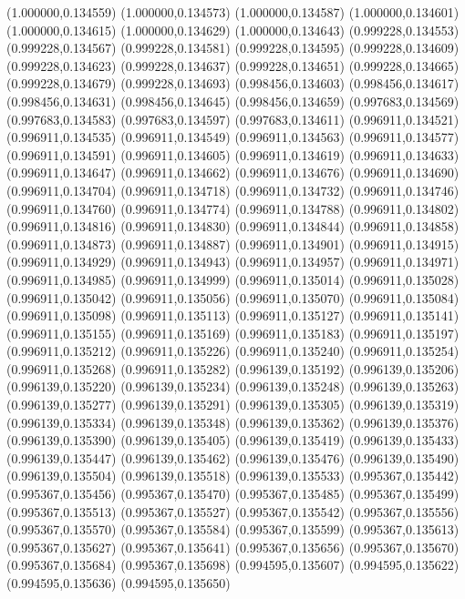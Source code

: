 (1.000000,0.134559)
(1.000000,0.134573)
(1.000000,0.134587)
(1.000000,0.134601)
(1.000000,0.134615)
(1.000000,0.134629)
(1.000000,0.134643)
(0.999228,0.134553)
(0.999228,0.134567)
(0.999228,0.134581)
(0.999228,0.134595)
(0.999228,0.134609)
(0.999228,0.134623)
(0.999228,0.134637)
(0.999228,0.134651)
(0.999228,0.134665)
(0.999228,0.134679)
(0.999228,0.134693)
(0.998456,0.134603)
(0.998456,0.134617)
(0.998456,0.134631)
(0.998456,0.134645)
(0.998456,0.134659)
(0.997683,0.134569)
(0.997683,0.134583)
(0.997683,0.134597)
(0.997683,0.134611)
(0.996911,0.134521)
(0.996911,0.134535)
(0.996911,0.134549)
(0.996911,0.134563)
(0.996911,0.134577)
(0.996911,0.134591)
(0.996911,0.134605)
(0.996911,0.134619)
(0.996911,0.134633)
(0.996911,0.134647)
(0.996911,0.134662)
(0.996911,0.134676)
(0.996911,0.134690)
(0.996911,0.134704)
(0.996911,0.134718)
(0.996911,0.134732)
(0.996911,0.134746)
(0.996911,0.134760)
(0.996911,0.134774)
(0.996911,0.134788)
(0.996911,0.134802)
(0.996911,0.134816)
(0.996911,0.134830)
(0.996911,0.134844)
(0.996911,0.134858)
(0.996911,0.134873)
(0.996911,0.134887)
(0.996911,0.134901)
(0.996911,0.134915)
(0.996911,0.134929)
(0.996911,0.134943)
(0.996911,0.134957)
(0.996911,0.134971)
(0.996911,0.134985)
(0.996911,0.134999)
(0.996911,0.135014)
(0.996911,0.135028)
(0.996911,0.135042)
(0.996911,0.135056)
(0.996911,0.135070)
(0.996911,0.135084)
(0.996911,0.135098)
(0.996911,0.135113)
(0.996911,0.135127)
(0.996911,0.135141)
(0.996911,0.135155)
(0.996911,0.135169)
(0.996911,0.135183)
(0.996911,0.135197)
(0.996911,0.135212)
(0.996911,0.135226)
(0.996911,0.135240)
(0.996911,0.135254)
(0.996911,0.135268)
(0.996911,0.135282)
(0.996139,0.135192)
(0.996139,0.135206)
(0.996139,0.135220)
(0.996139,0.135234)
(0.996139,0.135248)
(0.996139,0.135263)
(0.996139,0.135277)
(0.996139,0.135291)
(0.996139,0.135305)
(0.996139,0.135319)
(0.996139,0.135334)
(0.996139,0.135348)
(0.996139,0.135362)
(0.996139,0.135376)
(0.996139,0.135390)
(0.996139,0.135405)
(0.996139,0.135419)
(0.996139,0.135433)
(0.996139,0.135447)
(0.996139,0.135462)
(0.996139,0.135476)
(0.996139,0.135490)
(0.996139,0.135504)
(0.996139,0.135518)
(0.996139,0.135533)
(0.995367,0.135442)
(0.995367,0.135456)
(0.995367,0.135470)
(0.995367,0.135485)
(0.995367,0.135499)
(0.995367,0.135513)
(0.995367,0.135527)
(0.995367,0.135542)
(0.995367,0.135556)
(0.995367,0.135570)
(0.995367,0.135584)
(0.995367,0.135599)
(0.995367,0.135613)
(0.995367,0.135627)
(0.995367,0.135641)
(0.995367,0.135656)
(0.995367,0.135670)
(0.995367,0.135684)
(0.995367,0.135698)
(0.994595,0.135607)
(0.994595,0.135622)
(0.994595,0.135636)
(0.994595,0.135650)
